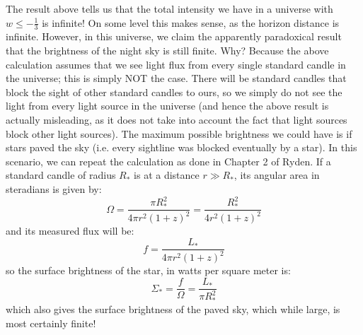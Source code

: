 The result above tells us that the total intensity we have in a universe with $w \leq -\frac{1}{3}$ is infinite! On some level this makes sense, as the horizon distance is infinite. However, in this universe, we claim the apparently paradoxical result that the brightness of the night sky is still finite. Why? Because the above calculation assumes that we see light flux from every single standard candle in the universe; this is simply NOT the case. There will be standard candles that block the sight of other standard candles to ours, so we simply do not see the light from every light source in the universe (and hence the above result is actually misleading, as it does not take into account the fact that light sources block other light sources). The maximum possible brightness we could have is if stars paved the sky (i.e. every sightline was blocked eventually by a star). In this scenario, we can repeat the calculation as done in Chapter 2 of Ryden. If a standard candle of radius $R_*$ is at a distance $r \gg R_*$, its angular area in steradians is given by:
\begin{equation}
    \Omega = \frac{\pi R_*^2}{4\pi r^2 (1+z)^2} = \frac{R_*^2}{4r^2(1+z)^2}
\end{equation}
and its measured flux will be:
\begin{equation}
    f = \frac{L_*}{4\pi r^2(1+z)^2}
\end{equation}
so the surface brightness of the star, in watts per square meter is:
\begin{equation}
    \Sigma_* = \frac{f}{\Omega} = \frac{L_*}{\pi R_*^2}
\end{equation}
which also gives the surface brightness of the paved sky, which while large, is most certainly finite!

